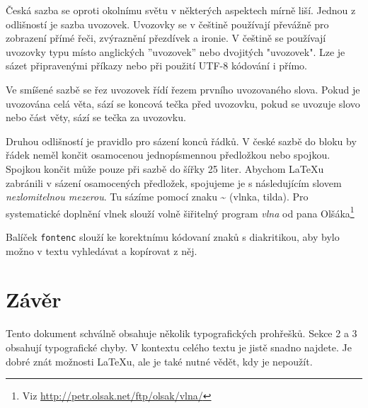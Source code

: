 \documentclass[a4paper, 10pt, twocolumn]{article}
\begin{document}
    Česká sazba se oproti okolnímu světu v některých aspektech mírně liší.
    Jednou z odlišností je sazba uvozovek. Uvozovky se v češtině používají převážně pro zobrazení
    přímé řeči, zvýraznění přezdívek a ironie.
    V češtině se používají uvozovky typu  místo anglických ''uvozovek'' nebo dvojitých
    "uvozovek". Lze je sázet připravenými příkazy nebo při použití UTF-8 kódování i přímo.
    
    Ve smíšené sazbě se řez uvozovek řídí řezem prvního uvozovaného slova. Pokud je uvozována 
    celá věta, sází se koncová tečka před uvozovku, pokud se uvozuje slovo nebo část věty, 
    sází se tečka za uvozovku.

    Druhou odlišností je pravidlo pro sázení konců řádků.
    V české sazbě do bloku by řádek neměl končit osamocenou jednopísmennou předložkou nebo spojkou.
    Spojkou  končit může pouze při sazbě do šířky 25 liter. Abychom \LaTeX u zabránili v
    sázení
    osamocených předložek, spojujeme je s následujícím slovem \textit{nezlomitelnou mezerou}. 
    Tu sázíme pomocí znaku \~{} (vlnka, tilda). Pro systematické doplnění vlnek slouží volně 
    šiřitelný program \textit{vlna} od pana Olšáka\footnote{Viz
    \url{http://petr.olsak.net/ftp/olsak/vlna/}}
    
    Balíček {\tt fontenc} slouží ke korektnímu kódovaní znaků s diakritikou, aby bylo možno 
    v textu vyhledávat a kopírovat z něj.

    \section{Závěr}
    
    Tento dokument schválně obsahuje několik typografických prohřešků. Sekce 2 a 3 obsahují
    typografické chyby. V kontextu celého textu je jistě snadno najdete.
    Je dobré znát možnosti \LaTeX u, ale je také nutné vědět, kdy je nepoužít.


\end{document}
